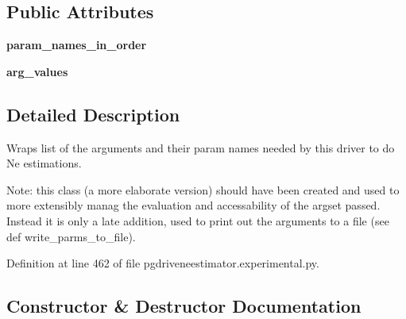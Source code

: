 \subsection*{Public Attributes}
\begin{DoxyCompactItemize}
\item 
{\bfseries param\+\_\+names\+\_\+in\+\_\+order}\hypertarget{classnegui_1_1pgdriveneestimator_1_1ArgSet_a0cdcbc98348d7b15a824518b1e1f61c1}{}\label{classnegui_1_1pgdriveneestimator_1_1ArgSet_a0cdcbc98348d7b15a824518b1e1f61c1}

\item 
{\bfseries arg\+\_\+values}\hypertarget{classnegui_1_1pgdriveneestimator_1_1ArgSet_a2e3b4f2876009bac711cac73863ffd18}{}\label{classnegui_1_1pgdriveneestimator_1_1ArgSet_a2e3b4f2876009bac711cac73863ffd18}

\end{DoxyCompactItemize}


\subsection{Detailed Description}
\begin{DoxyVerb}Wraps list of the arguments and their param names
needed by this driver to do Ne estimations.

Note: this class (a more elaborate version) should have 
been created and used to more extensibly manag
the evaluation and accessability of the argset passed. 
Instead it is only a late addition,
used to print out the arguments to a file (see def 
write_parms_to_file).
\end{DoxyVerb}
 

Definition at line 462 of file pgdriveneestimator.\+experimental.\+py.



\subsection{Constructor \& Destructor Documentation}
